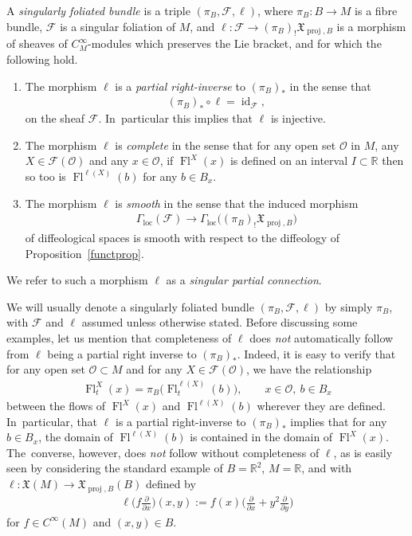 \documentclass[10pt,a4paper]{amsart}
\numberwithin{equation}{section}
\def\loc{\operatorname{loc}}
\def\id{\operatorname{id}}
\def\proj{\operatorname{proj}}
\def\Fl{\operatorname{Fl}}
\def\FF{{\mathcal{F}}}
\def\OO{{\mathcal{O}}}
\def\RB{{\mathbb{R}}}
\def\XF{{\mathfrak{X}}}
\begin{document}
\begin{Definition}\label{singfolbund}
A \textit{singularly foliated bundle} is a triple $(\pi_{B},\FF,\ell)$, where $\pi_{B}\colon B\rightarrow M$ is a fibre bundle, $\FF$ is a singular foliation of $M$, and $\ell\colon \FF\rightarrow(\pi_{B})_{!}\XF_{\proj,B}$ is a morphism of sheaves of $C^{\infty}_{M}$-modules which preserves the Lie bracket, and for which the following hold.
\begin{enumerate}\itemsep=0pt
\item The morphism $\ell$ is a \textit{partial right-inverse} to $(\pi_{B})_{*}$ in the sense that
\begin{gather*}
(\pi_{B})_{*}\circ\ell = \id_{\FF},
\end{gather*}
on the sheaf $\FF$. In~particular this implies that $\ell$ is injective.
\item The morphism $\ell$ is \textit{complete} in the sense that for any open set $\OO$ in $M$, any $X\in\FF(\OO)$ and any $x\in\OO$, if $\Fl^{X}(x)$ is defined on an interval $I\subset\RB$ then so too is $\Fl^{\ell(X)}(b)$ for any $b\in B_{x}$.
\item The morphism $\ell$ is \textit{smooth} in the sense that the induced morphism
\begin{gather*}
\Gamma_{\loc}(\FF)\rightarrow \Gamma_{\loc}\big((\pi_{B})_{!}\XF_{\proj,B}\big)
\end{gather*}
of diffeological spaces is smooth with respect to the diffeology of Proposition~\ref{functprop}.
\end{enumerate}
We refer to such a morphism $\ell$ as a \textit{singular partial connection}.
\end{Definition}

We will usually denote a singularly foliated bundle $(\pi_{B},\FF,\ell)$ by simply $\pi_{B}$, with $\FF$ and $\ell$ assumed unless otherwise stated. Before discussing some examples, let us mention that completeness of $\ell$ does \textit{not} automatically follow from $\ell$ being a partial right inverse to $(\pi_{B})_{*}$. Indeed, it is easy to verify that for any open set $\OO\subset M$ and for any $X\in\FF(\OO)$, we have the relationship
\begin{gather*}
\Fl^{X}_{t}(x) = \pi_{B}\big(\Fl^{\ell(X)}_{t}(b)\big),\qquad x\in\OO,\ b\in B_{x}
\end{gather*}
between the flows of $\Fl^{X}(x)$ and $\Fl^{\ell(X)}(b)$ wherever they are defined. In~particular, that $\ell$ is a partial right-inverse to $(\pi_{B})_{*}$ implies that for any $b\in B_{x}$, the domain of $\Fl^{\ell(X)}(b)$ is contained in the domain of $\Fl^{X}(x)$. The~converse, however, does \textit{not} follow without completeness of $\ell$, as is easily seen by considering the standard example of $B =\RB^{2}$, $M = \RB$, and with $\ell\colon \XF(M)\rightarrow\XF_{\proj,B}(B)$ defined by
\begin{gather*}
\ell\bigg(f\frac{\partial}{\partial x}\bigg)(x,y):=f(x)\bigg(\frac{\partial}{\partial x}+y^{2}\frac{\partial}{\partial y}\bigg)
\end{gather*}
for $f\in C^{\infty}(M)$ and $(x,y)\in B$.
\end{document}
